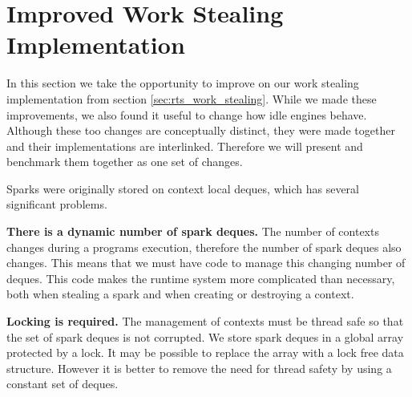
\section{Improved Work Stealing Implementation}
\label{sec:rts_work_stealing2}


In this section we take the opportunity to improve on our work stealing
implementation from section \ref{sec:rts_work_stealing}.
While we made these improvements,
we also found it useful to change how idle engines behave.
Although these too changes are conceptually distinct,
they were made together and their implementations are interlinked.
Therefore we will present and benchmark them together as one set of changes.

Sparks were originally stored on context local deques,
which has several significant problems.

\textbf{There is a dynamic number of spark deques.}
The number of contexts changes during a programs execution,
therefore the number of spark deques also changes.
This means that we must have code to manage this changing number of
deques.
This code makes the runtime system more complicated than necessary,
both when stealing a spark and when creating or destroying a context.

\textbf{Locking is required.}
The management of contexts must be thread safe so that the set of
spark deques is not corrupted.
We store spark deques in a global array protected by a lock.
It may be possible to replace the array with a lock free data structure.
However it is better to remove the need for thread safety by using a
constant set of deques.

